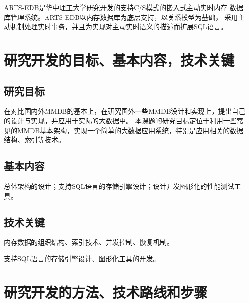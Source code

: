 \documentclass[proposal]{zjutreport}
\begin{document}
ARTS-EDB是华中理工大学研究开发的支持C/S模式的嵌入式主动实时内存
数据库管理系统。ARTS-EDB以内存数据库为底层支持，以关系模型为基础，
采用主动机制处理实时事务，并且为实现对主动实时语义的描述而扩展SQL语言。

\chapter{研究开发的目标、基本内容，技术关键}
\section{研究目标}
在对比国内外MMDB的基本上，在研究国外一些MMDB设计和实现上，提出自己的设计与实现，并应用于实际的大数据中。
本课题的研究目标定位于利用一些常见的MMDB基本架构，实现一个简单的大数据应用系统，特别是应用相关的数据结构、索引等技术。

\section{基本内容}
总体架构的设计；支持SQL语言的存储引擎设计；设计开发图形化的性能测试工具。

\section{技术关键}
内存数据的组织结构、索引技术、并发控制、恢复机制。

支持SQL语言的存储引擎设计、图形化工具的开发。

\chapter{研究开发的方法、技术路线和步骤}


\backmatter
\endgroup %
\clearpage %

\nocite{*}                                   %

\end{document}
